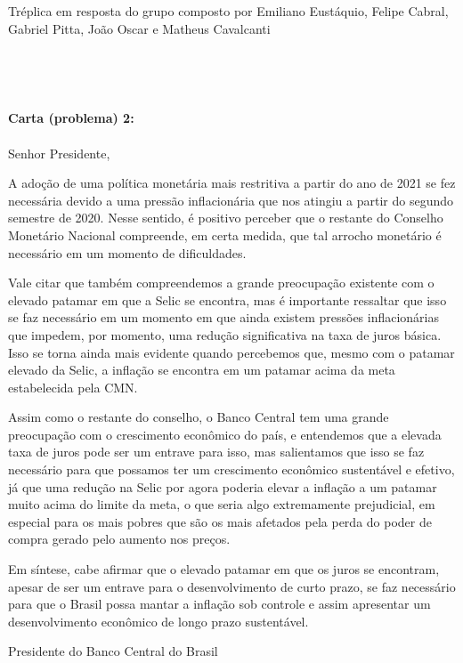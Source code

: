 \documentclass[11pt,a4paper]{letter} %
\def\opening#1{\thispagestyle{empty}
{\centering\fromaddress \vspace{0.6in} \\ %
\hspace*{\longindentation}\hspace*{\fill}\par} %
{\raggedright \toname \\ \toaddress \par} %
\vspace{0.4in} %
\noindent #1 %
}
\begin{document}
\begin{letter}
{Tréplica em resposta do grupo composto por Emiliano Eustáquio, Felipe Cabral, Gabriel Pitta, João Oscar e Matheus Cavalcanti}

\opening{\textbf{Carta (problema) 2:}\\\\
Senhor Presidente,}

A adoção de uma política monetária mais restritiva a partir do ano de 2021 se fez necessária devido a uma pressão inflacionária que nos atingiu a partir do segundo semestre de 2020. Nesse sentido, é positivo perceber que o restante do Conselho Monetário Nacional compreende, em certa medida, que tal arrocho monetário é necessário em um momento de dificuldades.

Vale citar que também compreendemos a grande preocupação existente com o
elevado patamar em que a Selic se encontra, mas é importante ressaltar que isso se faz necessário em um momento em que ainda existem pressões inflacionárias que impedem, por momento, uma redução significativa na taxa de juros básica. Isso se torna ainda mais evidente quando percebemos que, mesmo com o patamar elevado da Selic, a inflação se encontra em um patamar acima da meta estabelecida pela CMN.

Assim como o restante do conselho, o Banco Central tem uma grande preocupação
com o crescimento econômico do país, e entendemos que a elevada taxa de juros pode ser um entrave para isso, mas salientamos que isso se faz necessário para que possamos ter um crescimento econômico sustentável e efetivo, já que uma redução na Selic por agora poderia elevar a inflação a um patamar muito acima do limite da meta, o que seria algo extremamente prejudicial, em especial para os mais pobres que são os mais afetados pela perda do poder de compra gerado pelo aumento nos preços.

Em síntese, cabe afirmar que o elevado patamar em que os juros se encontram,
apesar de ser um entrave para o desenvolvimento de curto prazo, se faz necessário para que o Brasil possa mantar a inflação sob controle e assim apresentar um desenvolvimento econômico de longo prazo sustentável.

\closing{Presidente do Banco Central do Brasil}


\end{letter}
\end{document}
